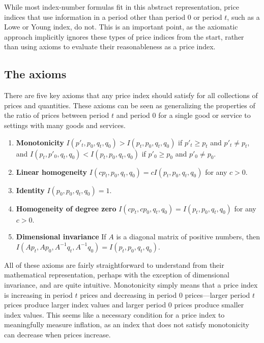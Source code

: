\documentclass[]{article}
\begin{document}
While most index-number formulas fit in this abstract representation, price indices that use information in a period other than period 0 or period \(t\), such as a Lowe or Young index, do not. This is an important point, as the axiomatic approach implicitly ignores these types of price indices from the start, rather than using axioms to evaluate their reasonableness as a price index.

\hypertarget{the-axioms}{%
\subsection{The axioms}\label{the-axioms}}

There are five key axioms that any price index should satisfy for all collections of prices and quantities. These axioms can be seen as generalizing the properties of the ratio of prices between period \(t\) and period 0 for a single good or service to settings with many goods and services.

\begin{enumerate}
\def\labelenumi{\arabic{enumi}.}
\item
  \textbf{Monotonicity} \(I(p'_{t}, p_{0}, q_{t}, q_{0}) > I(p_{t}, p_{0}, q_{t}, q_{0})\) if \(p'_{t} \geq p_{t}\) and \(p'_{t} \neq p_{t}\), and \(I(p_{t}, p'_{0}, q_{t}, q_{0}) < I(p_{t}, p_{0}, q_{t}, q_{0})\) if \(p'_{0} \geq p_{0}\) and \(p'_{0} \neq p_{0}\).
\item
  \textbf{Linear homogeneity} \(I(cp_{t}, p_{0}, q_{t}, q_{0}) = cI(p_{t}, p_{0}, q_{t}, q_{0})\) for any \(c > 0\).
\item
  \textbf{Identity} \(I(p_{0}, p_{0}, q_{t}, q_{0}) = 1\).
\item
  \textbf{Homogeneity of degree zero} \(I(cp_{t}, cp_{0}, q_{t}, q_{0}) = I(p_{t}, p_{0}, q_{t}, q_{0})\) for any \(c > 0\).
\item
  \textbf{Dimensional invariance} If \(A\) is a diagonal matrix of positive numbers, then \(I(Ap_{t}, Ap_{0}, A^{-1}q_{t}, A^{-1}q_{0}) = I(p_{t}, p_{0}, q_{t}, q_{0})\).
\end{enumerate}

All of these axioms are fairly straightforward to understand from their mathematical representation, perhaps with the exception of dimensional invariance, and are quite intuitive. Monotonicity simply means that a price index is increasing in period \(t\) prices and decreasing in period 0 prices---larger period \(t\) prices produce larger index values and larger period 0 prices produce smaller index values. This seems like a necessary condition for a price index to meaningfully measure inflation, as an index that does not satisfy monotonicity can decrease when prices increase.
\end{document}
